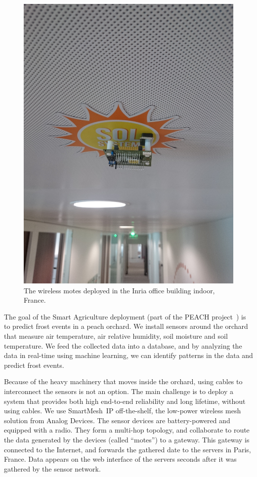 \documentclass{elsarticle}
\newcommand{\smip}                {SmartMesh~IP\xspace}
\newcommand{\agri}                {Smart Agriculture\xspace}
\begin{document}
\begin{figure}
\begin{minipage}[t]{0.48\textwidth}
        \includegraphics[width=\textwidth]{smartbuilding_indoor}
        \caption{The wireless motes deployed in the Inria office building indoor, France.}
        \label{fig:evalab_map}
    \end{minipage}
    \hfill
\end{figure}



The goal of the \agri deployment (part of the PEACH project~\cite{watteyne16peach}) is to predict frost events in a peach orchard.
We install sensors around the orchard that measure air temperature, air relative humidity, soil moisture and soil temperature.
We feed the collected data into a database, and by analyzing the data in real-time using machine learning, we can identify patterns in the data and predict frost events.


Because of the heavy machinery that moves inside the orchard, using cables to interconnect the sensors is not an option.
The main challenge is to deploy a system that provides both high end-to-end reliability and long lifetime, without using cables.
We use \smip off-the-shelf, the low-power wireless mesh solution from Analog Devices.
The sensor devices are battery-powered and equipped with a radio.
They form a multi-hop topology, and collaborate to route the data generated by the devices (called ``motes'') to a gateway.
This gateway is connected to the Internet, and forwards the gathered date to the servers in Paris, France.
Data appears on the web interface of the servers seconds after it was gathered by the sensor network.
\end{document}
